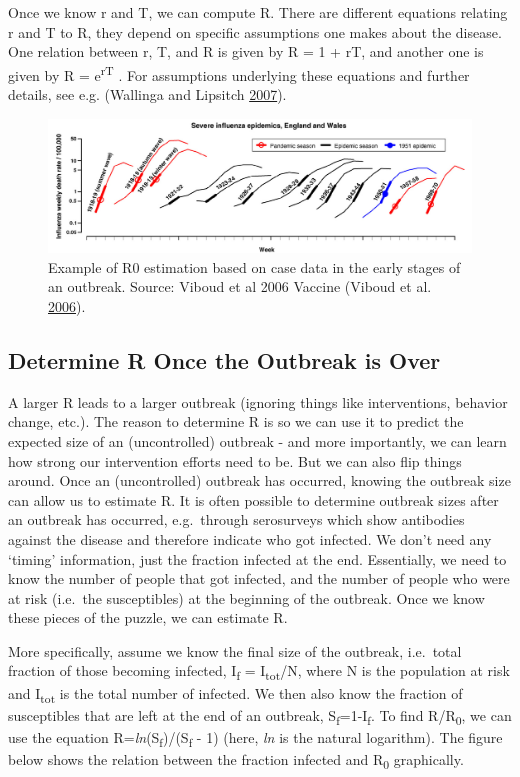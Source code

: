 \documentclass[]{book}
\theoremstyle{definition}
\theoremstyle{definition}
\theoremstyle{definition}
\theoremstyle{remark}
\begin{document}
Once we know r and T, we can compute R. There are different equations
relating r and T to R, they depend on specific assumptions one makes
about the disease. One relation between r, T, and R is given by R = 1 +
rT, and another one is given by R = e\textsuperscript{rT} . For
assumptions underlying these equations and further details, see e.g.
(Wallinga and Lipsitch \protect\hyperlink{ref-wallinga07}{2007}).

\begin{figure}
\centering
\includegraphics{./images/viboud-R0.png}
\caption{\label{fig:viboudR0}Example of R0 estimation based on case data in
the early stages of an outbreak. Source: Viboud et al 2006 Vaccine
(Viboud et al. \protect\hyperlink{ref-viboud06}{2006}).}
\end{figure}

\subsection{Determine R Once the Outbreak is
Over}\label{determine-r-once-the-outbreak-is-over}

A larger R leads to a larger outbreak (ignoring things like
interventions, behavior change, etc.). The reason to determine R is so
we can use it to predict the expected size of an (uncontrolled) outbreak
- and more importantly, we can learn how strong our intervention efforts
need to be. But we can also flip things around. Once an (uncontrolled)
outbreak has occurred, knowing the outbreak size can allow us to
estimate R. It is often possible to determine outbreak sizes after an
outbreak has occurred, e.g.~through serosurveys which show antibodies
against the disease and therefore indicate who got infected. We don't
need any `timing' information, just the fraction infected at the end.
Essentially, we need to know the number of people that got infected, and
the number of people who were at risk (i.e.~the susceptibles) at the
beginning of the outbreak. Once we know these pieces of the puzzle, we
can estimate R.

More specifically, assume we know the final size of the outbreak,
i.e.~total fraction of those becoming infected, I\textsubscript{f} =
I\textsubscript{tot}/N, where N is the population at risk and
I\textsubscript{tot} is the total number of infected. We then also know
the fraction of susceptibles that are left at the end of an outbreak,
S\textsubscript{f}=1-I\textsubscript{f}. To find R/R\textsubscript{0},
we can use the equation
R=\emph{ln}(S\textsubscript{f})/(S\textsubscript{f} - 1) (here,
\emph{ln} is the natural logarithm). The figure below shows the relation
between the fraction infected and R\textsubscript{0} graphically.
\end{document}
